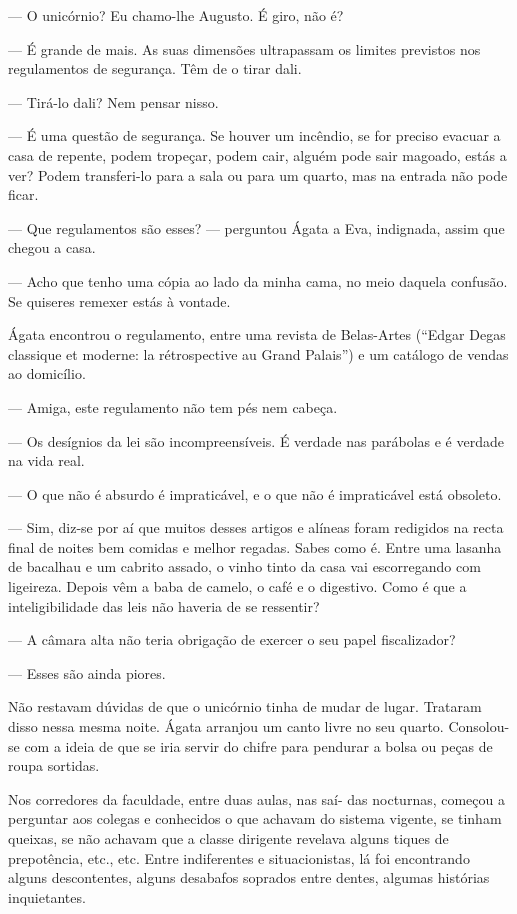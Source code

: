 --- O unicórnio? Eu chamo-lhe Augusto. É giro, não é?

--- É grande de mais. As suas dimensões ultrapassam os limites previstos
  nos regulamentos de segurança. Têm de o tirar dali.

--- Tirá-lo dali? Nem pensar nisso.

--- É uma questão de segurança. Se houver um incêndio, se for preciso
  evacuar a casa de repente, podem tropeçar, podem cair, alguém pode
  sair magoado, estás a ver? Podem transferi-lo para a sala ou para um
  quarto, mas na entrada não pode ficar.

--- Que regulamentos são esses? --- perguntou Ágata a Eva, indignada,
  assim que chegou a casa.

--- Acho que tenho uma cópia ao lado da minha cama, no meio daquela
  confusão. Se quiseres remexer estás à vontade.

Ágata encontrou o regulamento, entre uma revista de Belas-Artes
(``Edgar Degas classique et moderne: la rétrospective au Grand Palais'')
e um catálogo de vendas ao domicílio.

--- Amiga, este regulamento não tem pés nem cabeça.

--- Os desígnios da lei são incompreensíveis. É verdade nas parábolas e é
  verdade na vida real.

--- O que não é absurdo é impraticável, e o que não é impraticável está
  obsoleto.

--- Sim, diz-se por aí que muitos desses artigos e alíneas foram redigidos
  na recta final de noites bem comidas e melhor regadas. Sabes como é.
  Entre uma lasanha de bacalhau e um cabrito assado, o vinho tinto da
  casa vai escorregando com ligeireza. Depois vêm a baba de camelo, o
  café e o digestivo. Como é que a inteligibilidade das leis não haveria
  de se ressentir?

--- A câmara alta não teria obrigação de exercer o seu papel
  fiscalizador?

--- Esses são ainda piores.

Não restavam dúvidas de que o unicórnio tinha de mudar de lugar.
Trataram disso nessa mesma noite. Ágata arranjou um canto livre no seu
quarto. Consolou-se com a ideia de que se iria servir do chifre para
pendurar a bolsa ou peças de roupa sortidas.

Nos corredores da faculdade, entre duas aulas, nas saí- das nocturnas,
começou a perguntar aos colegas e conhecidos o que achavam do sistema
vigente, se tinham queixas, se não achavam que a classe dirigente
revelava alguns tiques de prepotência, etc., etc. Entre indiferentes e
situacionistas, lá foi encontrando alguns descontentes, alguns desabafos
soprados entre dentes, algumas histórias inquietantes.


